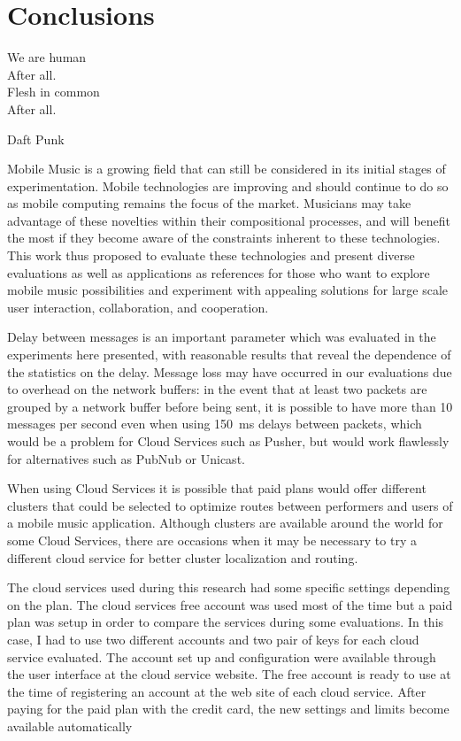 \chapter{Conclusions}
\label{cap:conclusions}



 \epigraph{
	We are human \\
	After all. \\
	Flesh in common \\
	After all.}
 {Daft Punk}



Mobile Music is a growing field that can still be considered in its initial stages of experimentation.
Mobile technologies are improving and should continue to do so as mobile computing remains the focus of the market.
Musicians may take advantage of these novelties within their compositional processes, and will benefit the most if they become aware of the constraints inherent to these technologies.
This work thus proposed to evaluate these technologies and present diverse evaluations as well as applications as references for those who want to explore mobile music possibilities and experiment with appealing solutions for large scale user interaction, collaboration, and cooperation. 

Delay between messages is an important parameter which was evaluated in the experiments here presented, with reasonable results that reveal the dependence of the statistics on the delay.
Message loss may have occurred in our evaluations due to overhead on the network buffers:
in the event that at least two packets are grouped by a network buffer before being sent, it is possible to have more than 10 messages per second even when using 150~ms delays between packets, which would be a problem for Cloud Services such as Pusher, but would work flawlessly for alternatives such as PubNub or Unicast.

When using Cloud Services it is possible that paid plans would offer different clusters that could be selected to optimize routes between performers and users of a mobile music application.
Although clusters are available around the world for some Cloud Services, there are occasions when it may be necessary to try a different cloud service for better cluster localization and routing.

The cloud services used during this research had some specific settings depending on the plan. 
The cloud services free account was used most of the time but a paid plan was setup in order to compare the services during some evaluations.
In this case, I had to use two different accounts and two pair of keys for each cloud service evaluated.
The account set up and configuration were available through the user interface at the cloud service website.
The free account is ready to use at the time of registering an account at the web site of each cloud service.
After paying for the paid plan with the credit card, the new settings and limits become available automatically

